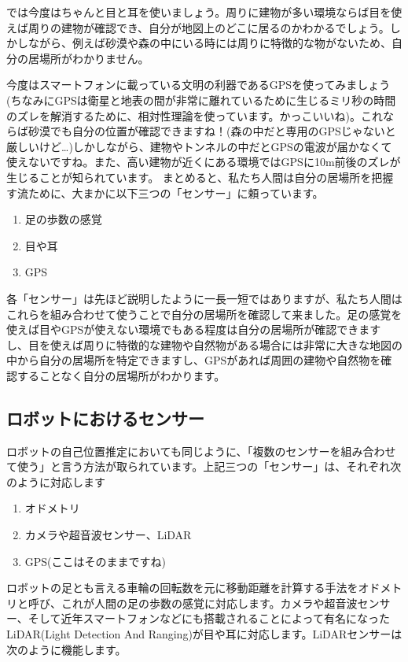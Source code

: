 \documentclass[12pt]{article}
\begin{document}
では今度はちゃんと目と耳を使いましょう。周りに建物が多い環境ならば目を使えば周りの建物が確認でき、自分が地図上のどこに居るのかわかるでしょう。しかしながら、例えば砂漠や森の中にいる時には周りに特徴的な物がないため、自分の居場所がわかりません。

今度はスマートフォンに載っている文明の利器であるGPSを使ってみましょう(ちなみにGPSは衛星と地表の間が非常に離れているために生じるミリ秒の時間のズレを解消するために、相対性理論を使っています。かっこいいね)。これならば砂漠でも自分の位置が確認できますね！(森の中だと専用のGPSじゃないと厳しいけど…)しかしながら、建物やトンネルの中だとGPSの電波が届かなくて使えないですね。また、高い建物が近くにある環境ではGPSに10m前後のズレが生じることが知られています。
まとめると、私たち人間は自分の居場所を把握す流ために、大まかに以下三つの「センサー」に頼っています。

\begin{enumerate}
	\item 足の歩数の感覚
	\item 目や耳
	\item GPS
\end{enumerate}


各「センサー」は先ほど説明したように一長一短ではありますが、私たち人間はこれらを組み合わせて使うことで自分の居場所を確認して来ました。足の感覚を使えば目やGPSが使えない環境でもある程度は自分の居場所が確認できますし、目を使えば周りに特徴的な建物や自然物がある場合には非常に大きな地図の中から自分の居場所を特定できますし、GPSがあれば周囲の建物や自然物を確認することなく自分の居場所がわかります。

\subsection{ロボットにおけるセンサー}


ロボットの自己位置推定においても同じように、「複数のセンサーを組み合わせて使う」と言う方法が取られています。上記三つの「センサー」は、それぞれ次のように対応します

\begin{enumerate}
	\item オドメトリ
	\item カメラや超音波センサー、LiDAR
	\item GPS(ここはそのままですね)
\end{enumerate}

ロボットの足とも言える車輪の回転数を元に移動距離を計算する手法をオドメトリと呼び、これが人間の足の歩数の感覚に対応します。カメラや超音波センサー、そして近年スマートフォンなどにも搭載されることによって有名になったLiDAR(Light Detection And Ranging)が目や耳に対応します。LiDARセンサーは次のように機能します。
\end{document}
